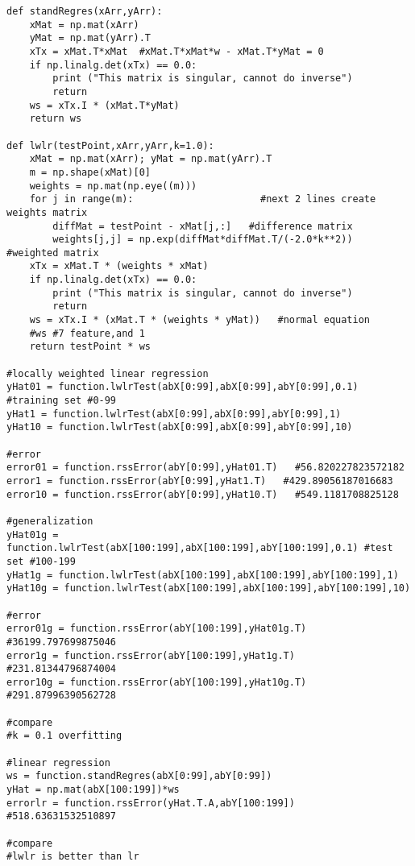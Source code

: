 \begin{lstlisting}
def standRegres(xArr,yArr):
    xMat = np.mat(xArr)
    yMat = np.mat(yArr).T
    xTx = xMat.T*xMat  #xMat.T*xMat*w - xMat.T*yMat = 0
    if np.linalg.det(xTx) == 0.0:
        print ("This matrix is singular, cannot do inverse")
        return
    ws = xTx.I * (xMat.T*yMat)
    return ws

def lwlr(testPoint,xArr,yArr,k=1.0):
    xMat = np.mat(xArr); yMat = np.mat(yArr).T
    m = np.shape(xMat)[0]
    weights = np.mat(np.eye((m)))
    for j in range(m):                      #next 2 lines create weights matrix
        diffMat = testPoint - xMat[j,:]   #difference matrix
        weights[j,j] = np.exp(diffMat*diffMat.T/(-2.0*k**2))   #weighted matrix
    xTx = xMat.T * (weights * xMat)
    if np.linalg.det(xTx) == 0.0:
        print ("This matrix is singular, cannot do inverse")
        return
    ws = xTx.I * (xMat.T * (weights * yMat))   #normal equation
    #ws #7 feature,and 1
    return testPoint * ws

#locally weighted linear regression
yHat01 = function.lwlrTest(abX[0:99],abX[0:99],abY[0:99],0.1) #training set #0-99
yHat1 = function.lwlrTest(abX[0:99],abX[0:99],abY[0:99],1)
yHat10 = function.lwlrTest(abX[0:99],abX[0:99],abY[0:99],10)

#error
error01 = function.rssError(abY[0:99],yHat01.T)   #56.820227823572182
error1 = function.rssError(abY[0:99],yHat1.T)   #429.89056187016683
error10 = function.rssError(abY[0:99],yHat10.T)   #549.1181708825128

#generalization
yHat01g = function.lwlrTest(abX[100:199],abX[100:199],abY[100:199],0.1) #test set #100-199
yHat1g = function.lwlrTest(abX[100:199],abX[100:199],abY[100:199],1)
yHat10g = function.lwlrTest(abX[100:199],abX[100:199],abY[100:199],10)

#error
error01g = function.rssError(abY[100:199],yHat01g.T)   #36199.797699875046
error1g = function.rssError(abY[100:199],yHat1g.T)   #231.81344796874004
error10g = function.rssError(abY[100:199],yHat10g.T)   #291.87996390562728

#compare
#k = 0.1 overfitting

#linear regression
ws = function.standRegres(abX[0:99],abY[0:99])
yHat = np.mat(abX[100:199])*ws
errorlr = function.rssError(yHat.T.A,abY[100:199])   #518.63631532510897

#compare
#lwlr is better than lr
\end{lstlisting}

